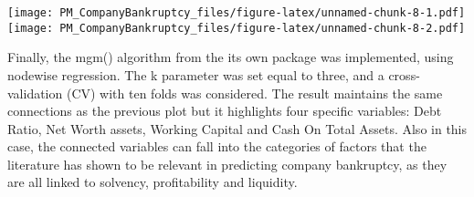 \documentclass[
]{article}
\begin{document}
\texttt{[image: PM\_CompanyBankruptcy\_files/figure-latex/unnamed-chunk-8-1.pdf]}
\texttt{[image: PM\_CompanyBankruptcy\_files/figure-latex/unnamed-chunk-8-2.pdf]}

Finally, the mgm() algorithm from the its own package was implemented,
using nodewise regression. The k parameter was set equal to three, and a
cross-validation (CV) with ten folds was considered. The result
maintains the same connections as the previous plot but it highlights
four specific variables: Debt Ratio, Net Worth assets, Working Capital
and Cash On Total Assets. Also in this case, the connected variables can
fall into the categories of factors that the literature has shown to be
relevant in predicting company bankruptcy, as they are all linked to
solvency, profitability and liquidity.

\begin{verbatim}

\end{verbatim}
\end{document}
